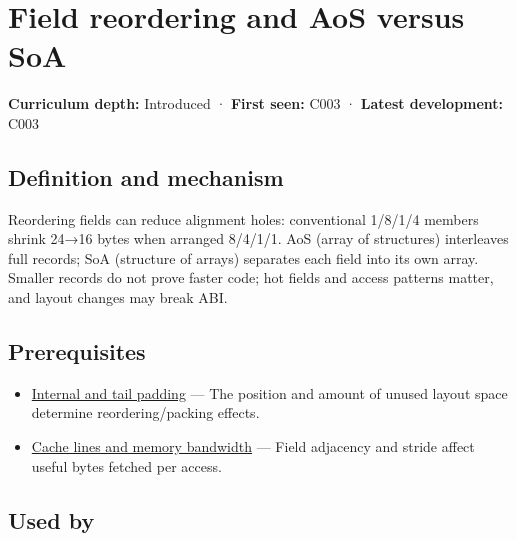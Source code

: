 \hypertarget{appendix-5522ad176ca0}{}\label{referencestart:appendix-5522ad176ca0}
\section{Field reordering and AoS versus SoA}\label{appendix-5522ad176ca0-field-reordering-and-aos-versus-soa}

\hypertarget{appendix-5522ad176ca0-field-reordering-and-aos-versus-soa}{}

\textbf{Curriculum depth:} Introduced · \textbf{First seen:} C003 · \textbf{Latest development:} C003

\begin{allmightroledefinition}

\subsection{Definition and mechanism}\label{appendix-5522ad176ca0-definition-and-mechanism}

\hypertarget{appendix-5522ad176ca0-definition-and-mechanism}{}

Reordering fields can reduce alignment holes: conventional 1/8/1/4 members shrink 24→16 bytes when arranged 8/4/1/1. AoS (array of structures) interleaves full records; SoA (structure of arrays) separates each field into its own array. Smaller records do not prove faster code; hot fields and access patterns matter, and layout changes may break ABI.

\end{allmightroledefinition}

\subsection{Prerequisites}\label{appendix-5522ad176ca0-prerequisites}

\hypertarget{appendix-5522ad176ca0-prerequisites}{}

\begin{itemize}
\tightlist
\item
  \hyperref[appendix-f52f8c5a3afd]{Internal and tail padding} --- The position and amount of unused layout space determine reordering/packing effects.
\item
  \hyperref[appendix-e4ccdbab8320]{Cache lines and memory bandwidth} --- Field adjacency and stride affect useful bytes fetched per access.
\end{itemize}

\subsection{Used by}\label{appendix-5522ad176ca0-used-by}

